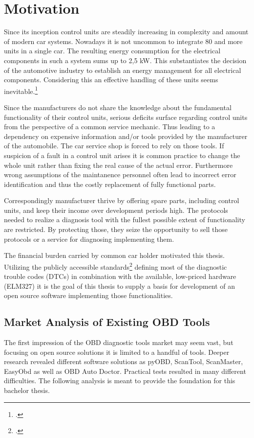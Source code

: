 
\chapter{Motivation}

Since its inception control units are steadily increasing in complexity and amount of modern car systems. Nowadays it is not uncommon to 
integrate 80 and more units in a single car. The resulting energy consumption for the electrical components in such a system sums up to 2,5 kW.
This substantiates the decision of the automotive industry to establish an energy management for all electrical components. Considering this an 
effective handling of these units seems inevitable.\footcite{SCHAFOBD1} 

Since the manufacturers do not share the knowledge about the fundamental 
functionality of their control units, serious deficits surface regarding control units from the perspective 
of a common service mechanic. Thus leading to a dependency on expensive information and/or tools provided by the manufacturer of the automobile.
The car service shop is forced to rely on those tools. If suspicion of a fault in a control unit arises it is common practice to change the whole 
unit rather than fixing the real cause of the actual error. Furthermore wrong assumptions of the maintanence personnel often lead to incorrect 
error identification and thus the costly replacement of fully functional parts.

Correspondingly manufacturer thrive by offering spare parts, including control units, and keep their income over development periods high. The 
protocols needed to realize a diagnosis tool with the fullest possible extent of functionality are restricted. By protecting those, they seize the 
opportunity to sell those protocols or a service for diagnosing implementing them. 

The financial burden carried by common car holder motivated this thesis. Utilizing the publicly accessible standards\footcite{ISO15031} defining most of the diagnostic 
trouble codes (DTCs) in combination with the available, low-priced hardware (ELM327) it is the goal of this thesis to supply a basis for development of 
an open source software implementing those functionalities.

\section{Market Analysis of Existing OBD Tools}
The first impression of the OBD diagnostic tools market may seem vast, but focusing on open source solutions it is limited to a handful of tools.
Deeper research revealed different software solutions as pyOBD, ScanTool, ScanMaster, EasyObd as well as OBD Auto Doctor. 
Practical tests resulted in many different difficulties. The following analysis is meant to provide the foundation for this bachelor 
thesis. 

